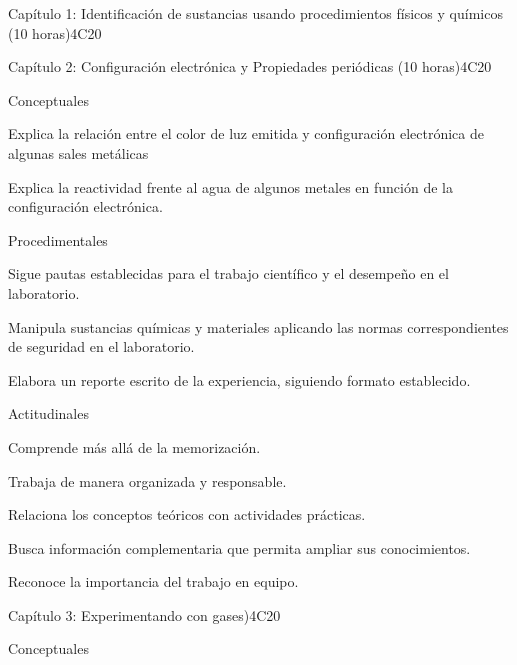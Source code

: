 \begin{syllabus}
\begin{unit}{Capítulo 1: Identificación de sustancias usando procedimientos físicos y químicos (10 horas)}{}{}{4}{C20}
   \begin{learningoutcomes}
      \item 
   \end{learningoutcomes}
\end{unit}

\begin{unit}{Capítulo 2: Configuración electrónica y Propiedades periódicas (10 horas)}{}{}{4}{C20}

Conceptuales

\begin{topics}
      \item Explica la relación entre el color de luz emitida y configuración electrónica de algunas sales metálicas
      \item Explica la reactividad frente al agua de algunos metales en función de la configuración electrónica.
   \end{topics}
   
   Procedimentales

\begin{topics}
      \item Sigue pautas establecidas para el trabajo científico y el desempeño en el laboratorio.
      \item Manipula sustancias químicas y materiales aplicando las normas correspondientes de seguridad en el laboratorio.
      \item Elabora un reporte escrito de la experiencia, siguiendo formato establecido.
   \end{topics}
   
   Actitudinales

\begin{topics}
      \item Comprende más allá de la memorización.
      \item Trabaja de manera organizada y responsable.
      \item Relaciona los conceptos teóricos con actividades prácticas.
      \item Busca información complementaria que permita ampliar sus conocimientos.
     \item Reconoce la importancia del trabajo en equipo.
   \end{topics}


\end{unit}

\begin{unit}{Capítulo 3: Experimentando con gases)}{}{}{4}{C20}

Conceptuales


\end{unit}
\end{syllabus}
